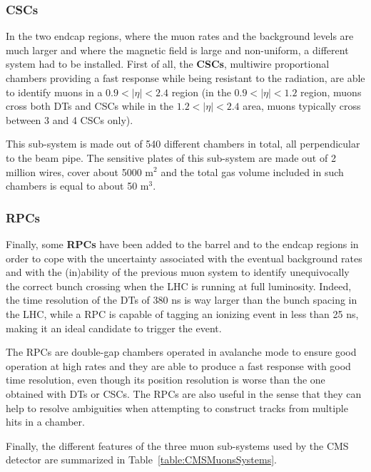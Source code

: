 \documentclass[a4paper, 10pt, openright]{report}
\begin{document}
\subsubsection*{\acfp{CSC}}

In the two endcap regions, where the muon rates and the background levels are much larger and where the magnetic field is large and non-uniform, a different system had to be installed. First of all, the \textbf{\acp{CSC}}, multiwire proportional chambers providing a fast response while being resistant to the radiation, are able to identify muons in a $0.9 < |\eta| < 2.4$ region (in the $0.9 < |\eta| < 1.2$ region, muons cross both \acp{DT} and \acp{CSC} while in the $1.2 < |\eta| < 2.4$ area, muons typically cross between 3 and 4 \acp{CSC} only). 

This sub-system is made out of 540 different chambers in total, all perpendicular to the beam pipe. The sensitive plates of this sub-system are made out of 2 million wires, cover about 5000 m$^2$ and the total gas volume included in such chambers is equal to about 50 m$^3$.

\subsubsection*{\acfp{RPC}}

Finally, some \textbf{\acp{RPC}} have been added to the barrel and to the endcap regions in order to cope with the uncertainty associated with the eventual background rates and with the (in)ability of the previous muon
system to identify unequivocally the correct bunch crossing when the \ac{LHC} is running at full luminosity. Indeed, the time resolution of the \acp{DT} of 380 ns is way larger than the bunch spacing in the \ac{LHC}, while a \ac{RPC} is capable
of tagging an ionizing event in less than 25 ns, making it an ideal candidate to trigger the event.

The \acp{RPC} are double-gap chambers operated in avalanche mode to ensure good operation at high rates and they are able to produce a fast response with good time resolution, even though its position resolution is worse than the one obtained with \acp{DT} or \acp{CSC}. The \acp{RPC} are also useful in the sense that they can help to resolve ambiguities when attempting to construct tracks from multiple hits in a chamber. 

Finally, the different features of the three muon sub-systems used by the \ac{CMS} detector are summarized in Table~\ref{table:CMSMuonsSystems}.
\end{document}
